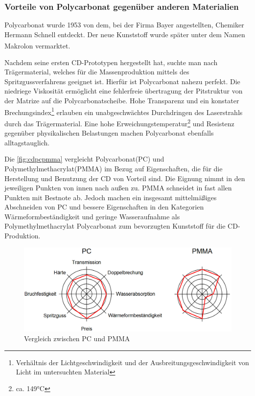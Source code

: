 \subsubsection{Vorteile von Polycarbonat gegenüber anderen Materialien}

Polycarbonat wurde 1953 von dem, bei der Firma Bayer angestellten, Chemiker
Hermann Schnell entdeckt. Der neue Kunststoff wurde später unter dem Namen
Makrolon\textsuperscript{\textregistered} vermarktet.

Nachdem seine ersten CD-Prototypen hergestellt hat, suchte man nach
Trägermaterial, welches für die Massenproduktion mittels des
Spritzgussverfahrens geeignet ist. Hierfür ist Polycarbonat nahezu perfekt. Die
niedriege Viskosität ermöglicht eine fehlerfreie übertragung der Pitstruktur von
der Matrize auf die Polycarbonatscheibe. Hohe Transparenz und ein konstater
Brechungsindex\footnote{Verhältnis der Lichtgeschwindigkeit und der
Ausbreitungsgeschwindigkeit von Licht im untersuchten Material} erlauben ein
unabgeschwächtes Durchdringen des Laserstrahls durch das Trägermaterial. Eine
hohe Erweichungstemperatur\footnote{ca. 149°C} und Resistenz gegenüber
physikalischen Belastungen machen Polycarbonat ebenfalls alltagstauglich.

Die \autoref{fig:cdpcpmma} vergleicht Polycarbonat(PC) und
Polymethylmethacrylat(PMMA) im Bezug auf Eigenschaften, die für die Herstellung
und Benutzung der CD von Vorteil sind. Die Eignung nimmt in den jeweiligen
Punkten von innen nach außen zu. PMMA schneidet in fast allen Punkten mit
Bestnote ab. Jedoch machen ein insgesamt mittelmäßiges Abschneiden von PC und
bessere Eigenschaften in den Kategorien Wärmeformbeständigkeit und geringe
Wasseraufnahme als Polymethylmethacrylat Polycarbonat zum bevorzugten Kunststoff
für die CD-Produktion.

\begin{figure}[h]
  \begin{center}
      \begin{minipage}[t]{\textwidth}
        \begin{center}
            \includegraphics[height=0.1\textheight]{Bilder/Optische_Datentraeger_Die_Compact_Disc/Material:_Polycarbonat/cdpcpmma.png}
            \caption[Vergleich zwischen PC und PMMA \newline Roth, Klaus: CD, DVD \& Co.: Die Chemie der schillernden Scheiben, in: Chemie in unserer Zeit (41/2007), S. 337]{Vergleich zwischen PC und PMMA}
            \label{fig:cdpcpmma}
        \end{center}
      \end{minipage}
  \end{center}
\end{figure}
